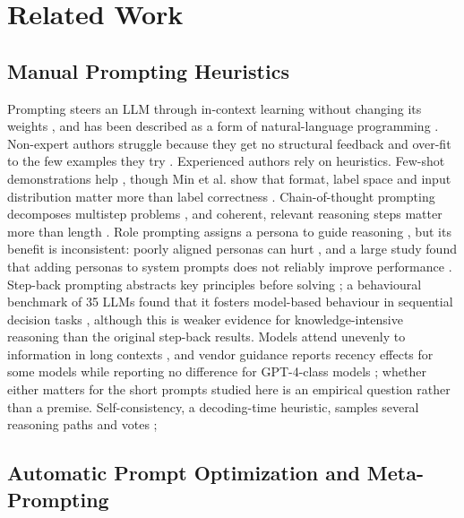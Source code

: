 \documentclass{ieeeaccess}
\begin{document}
\section{Related Work}

\subsection{Manual Prompting Heuristics}

Prompting steers an LLM through in-context learning without changing its weights \cite{liu2023,brown2020}, and has been described as a form of natural-language programming \cite{reynolds2021}. Non-expert authors struggle because they get no structural feedback and over-fit to the few examples they try \cite{zamfirescupereira2023}. Experienced authors rely on heuristics. Few-shot demonstrations help \cite{brown2020,dong2024}, though Min et al. show that format, label space and input distribution matter more than label correctness \cite{min2022}. Chain-of-thought prompting decomposes multistep problems \cite{wei2022,kojima2022}, and coherent, relevant reasoning steps matter more than length \cite{wang2024,wang2023}. Role prompting assigns a persona to guide reasoning \cite{kong2024}, but its benefit is inconsistent: poorly aligned personas can hurt \cite{kim2024}, and a large study found that adding personas to system prompts does not reliably improve performance \cite{zheng2024b}. Step-back prompting abstracts key principles before solving \cite{zheng2024}; a behavioural benchmark of 35 LLMs found that it fosters model-based behaviour in sequential decision tasks \cite{codaforno2024}, although this is weaker evidence for knowledge-intensive reasoning than the original step-back results. Models attend unevenly to information in long contexts \cite{liu2024,yu2025}, and vendor guidance reports recency effects for some models while reporting no difference for GPT-4-class models \cite{microsoft2025}; whether either matters for the short prompts studied here is an empirical question rather than a premise. Self-consistency, a decoding-time heuristic, samples several reasoning paths and votes \cite{wang2023b};

\subsection{Automatic Prompt Optimization and Meta-Prompting}
\end{document}

